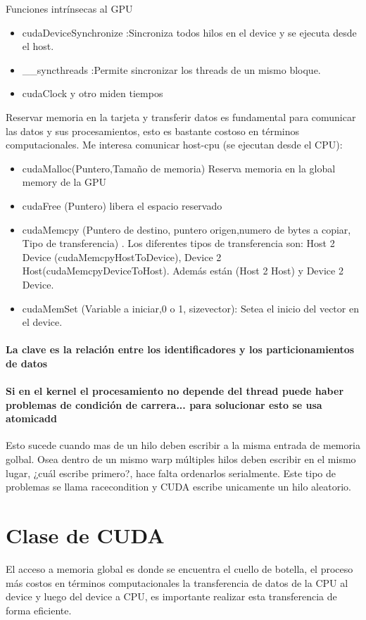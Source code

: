 \documentclass[]{scrartcl}
\begin{document}
Funciones intrínsecas al GPU


\begin{itemize}
	\item cudaDeviceSynchronize :Sincroniza todos hilos en el device y se ejecuta desde el host. 
	\item \_\_syncthreads  :Permite sincronizar los threads de un mismo bloque. 
	\item cudaClock y otro miden tiempos
\end{itemize}

Reservar memoria en la tarjeta y transferir datos es fundamental para comunicar las datos y sus procesamientos, esto es bastante costoso en términos computacionales. Me interesa comunicar host-cpu (se ejecutan desde el CPU):
\begin{itemize}
	\item cudaMalloc(Puntero,Tamaño de memoria) Reserva memoria en la global memory de la GPU
	\item cudaFree (Puntero) libera el espacio reservado
	\item cudaMemcpy (Puntero de destino, puntero origen,numero de bytes a copiar, Tipo de transferencia) . Los diferentes tipos de transferencia son:  Host 2 Device (cudaMemcpyHostToDevice), Device 2 Host(cudaMemcpyDeviceToHost). Además están (Host 2 Host) y Device 2 Device.
	\item cudaMemSet (Variable a iniciar,0 o 1, sizevector): Setea el inicio del vector en el device.
\end{itemize}

\paragraph{La clave es la relación entre los identificadores y los particionamientos de datos}
\paragraph{Si en el kernel el procesamiento no depende del thread puede haber problemas de condición de carrera... para solucionar esto se usa atomicadd} Esto sucede cuando mas de un hilo deben escribir a la misma entrada de memoria golbal. Osea dentro de un mismo warp múltiples hilos deben escribir en el mismo lugar, ¿cuál escribe primero?, hace falta ordenarlos serialmente. Este tipo de problemas se llama racecondition y CUDA escribe unicamente un hilo aleatorio. 




\section{Clase de CUDA}
El acceso a memoria global es donde se encuentra el cuello de botella, el proceso más costos en términos computacionales la transferencia de datos de la CPU al device y luego del device a CPU, es importante realizar esta transferencia de forma eficiente. 
\end{document}
